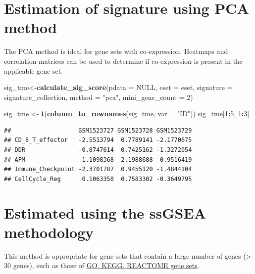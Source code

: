 \documentclass[
  12pt,
]{book}
\newenvironment{Shaded}{\begin{snugshade}}{\end{snugshade}}
\newcommand{\AttributeTok}[1]{\textcolor[rgb]{0.13,0.29,0.53}{#1}}
\newcommand{\ConstantTok}[1]{\textcolor[rgb]{0.56,0.35,0.01}{#1}}
\newcommand{\DecValTok}[1]{\textcolor[rgb]{0.00,0.00,0.81}{#1}}
\newcommand{\FunctionTok}[1]{\textcolor[rgb]{0.13,0.29,0.53}{\textbf{#1}}}
\newcommand{\NormalTok}[1]{#1}
\newcommand{\OtherTok}[1]{\textcolor[rgb]{0.56,0.35,0.01}{#1}}
\newcommand{\SpecialCharTok}[1]{\textcolor[rgb]{0.81,0.36,0.00}{\textbf{#1}}}
\newcommand{\StringTok}[1]{\textcolor[rgb]{0.31,0.60,0.02}{#1}}
\begin{document}
\hypertarget{estimation-of-signature-using-pca-method}{%
\section{Estimation of signature using PCA method}\label{estimation-of-signature-using-pca-method}}

The PCA method is ideal for gene sets with co-expression. Heatmaps and correlation matrices can be used to determine if co-expression is present in the applicable gene set.

\begin{Shaded}
\begin{Highlighting}[]
\NormalTok{sig\_tme}\OtherTok{\textless{}{-}}\FunctionTok{calculate\_sig\_score}\NormalTok{(}\AttributeTok{pdata           =} \ConstantTok{NULL}\NormalTok{,}
                             \AttributeTok{eset            =}\NormalTok{ eset,}
                             \AttributeTok{signature       =}\NormalTok{ signature\_collection,}
                             \AttributeTok{method          =} \StringTok{"pca"}\NormalTok{,}
                             \AttributeTok{mini\_gene\_count =} \DecValTok{2}\NormalTok{)}

\NormalTok{sig\_tme }\OtherTok{\textless{}{-}} \FunctionTok{t}\NormalTok{(}\FunctionTok{column\_to\_rownames}\NormalTok{(sig\_tme, }\AttributeTok{var =} \StringTok{"ID"}\NormalTok{))}
\NormalTok{sig\_tme[}\DecValTok{1}\SpecialCharTok{:}\DecValTok{5}\NormalTok{, }\DecValTok{1}\SpecialCharTok{:}\DecValTok{3}\NormalTok{]}
\end{Highlighting}
\end{Shaded}

\begin{verbatim}
##                   GSM1523727 GSM1523728 GSM1523729
## CD_8_T_effector   -2.5513794  0.7789141 -2.1770675
## DDR               -0.8747614  0.7425162 -1.3272054
## APM                1.1098368  2.1988688 -0.9516419
## Immune_Checkpoint -2.3701787  0.9455120 -1.4844104
## CellCycle_Reg      0.1063358  0.7583302 -0.3649795
\end{verbatim}

\hypertarget{estimated-using-the-ssgsea-methodology}{%
\section{Estimated using the ssGSEA methodology}\label{estimated-using-the-ssgsea-methodology}}

This method is appropriate for gene sets that contain a large number of genes (\textgreater{} 30 genes), such as those of \href{https://www.gsea-msigdb.org/gsea/msigdb}{GO, KEGG, REACTOME gene sets}.
\end{document}
